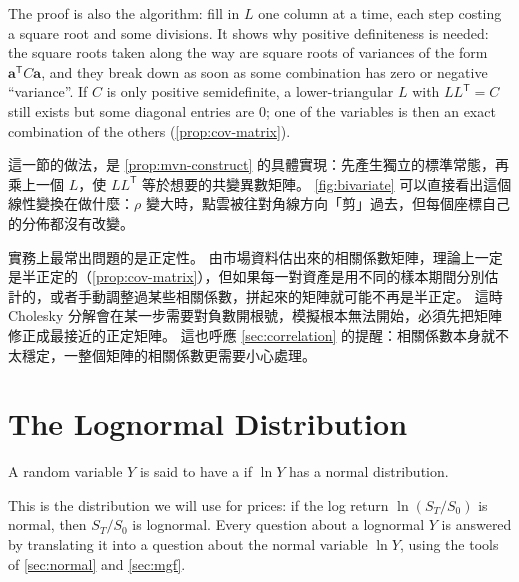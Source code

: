 The proof is also the algorithm: fill in $L$ one column at a time, each step costing a square root and some divisions.
It shows why positive definiteness is needed: the square roots taken along the way are square roots of variances of the form $\bm{a}^{\mathsf{T}}C\bm{a}$, and they break down as soon as some combination has zero or negative ``variance''.
If $C$ is only positive semidefinite, a lower-triangular $L$ with $LL^{\mathsf{T}}=C$ still exists but some diagonal entries are $0$; one of the variables is then an exact combination of the others (\autoref{prop:cov-matrix}).

\begin{remark}
	這一節的做法，是 \autoref{prop:mvn-construct} 的具體實現：先產生獨立的標準常態，再乘上一個 $L$，使 $LL^{\mathsf{T}}$ 等於想要的共變異數矩陣。
	\autoref{fig:bivariate} 可以直接看出這個線性變換在做什麼：$\rho$ 變大時，點雲被往對角線方向「剪」過去，但每個座標自己的分佈都沒有改變。

	實務上最常出問題的是正定性。
	由市場資料估出來的相關係數矩陣，理論上一定是半正定的（\autoref{prop:cov-matrix}），但如果每一對資產是用不同的樣本期間分別估計的，或者手動調整過某些相關係數，拼起來的矩陣就可能不再是半正定。
	這時 Cholesky 分解會在某一步需要對負數開根號，模擬根本無法開始，必須先把矩陣修正成最接近的正定矩陣。
	這也呼應 \autoref{sec:correlation} 的提醒：相關係數本身就不太穩定，一整個矩陣的相關係數更需要小心處理。
\end{remark}
\suppend

\section{The Lognormal Distribution}
\label{sec:lognormal}


\begin{definition}
	A random variable $Y$ is said to have a  if $\ln Y$ has a normal distribution.
\end{definition}

\suppstart
This is the distribution we will use for prices: if the log return $\ln(S_{T}/S_{0})$ is normal, then $S_{T}/S_{0}$ is lognormal.
Every question about a lognormal $Y$ is answered by translating it into a question about the normal variable $\ln Y$, using the tools of \autoref{sec:normal} and \autoref{sec:mgf}.
\suppend

